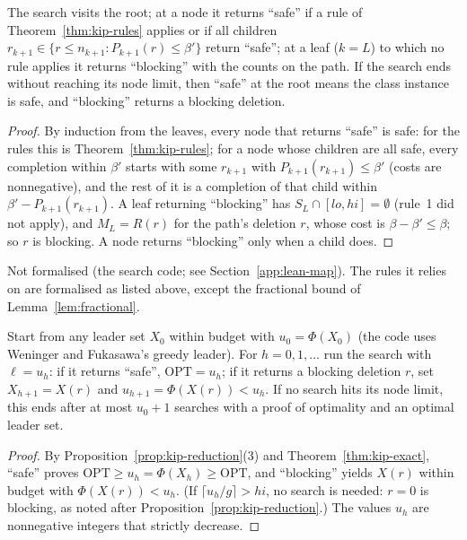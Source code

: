 \begin{theorem}[Exactness]\label{thm:kip-exact}
The search visits the root; at a node it returns ``safe'' if a rule of
Theorem~\ref{thm:kip-rules} applies or if all children
$r_{k+1}\in\{r\le n_{k+1}:P_{k+1}(r)\le\beta'\}$ return ``safe''; at a leaf
($k=L$) to which no rule applies it returns ``blocking'' with the counts on
the path. If the search ends without reaching its node limit, then ``safe''
at the root means the class instance is safe, and ``blocking'' returns a
blocking deletion.
\end{theorem}
\begin{proof}
By induction from the leaves, every node that returns ``safe'' is safe: for
the rules this is Theorem~\ref{thm:kip-rules}; for a node whose children are
all safe, every completion within $\beta'$ starts with some $r_{k+1}$ with
$P_{k+1}(r_{k+1})\le\beta'$ (costs are nonnegative), and the rest of it is a
completion of that child within $\beta'-P_{k+1}(r_{k+1})$. A leaf returning
``blocking'' has $S_L\cap[lo,hi]=\emptyset$ (rule~1 did not apply), and $M_L=R(r)$
for the path's deletion $r$, whose cost is $\beta-\beta'\le\beta$; so $r$ is
blocking. A node returns ``blocking'' only when a child does.
\end{proof}
\noindent Not formalised (the search code; see Section~\ref{app:lean-map}).
The rules it relies on are formalised as listed above, except the fractional
bound of Lemma~\ref{lem:fractional}.

\begin{corollary}\label{cor:kip-loop}
Start from any leader set $X_0$ within budget with $u_0=\Phi(X_0)$ (the code
uses Weninger and Fukasawa's greedy leader). For $h=0,1,\dots$ run the search
with $\ell=u_h$: if it returns ``safe'', $\mathrm{OPT}=u_h$; if it returns a
blocking deletion $r$, set $X_{h+1}=X(r)$ and $u_{h+1}=\Phi(X(r))<u_h$. If no
search hits its node limit, this ends after at most $u_0+1$ searches with a
proof of optimality and an optimal leader set.
\end{corollary}
\begin{proof}
By Proposition~\ref{prop:kip-reduction}(3) and Theorem~\ref{thm:kip-exact},
``safe'' proves $\mathrm{OPT}\ge u_h=\Phi(X_h)\ge\mathrm{OPT}$, and ``blocking''
yields $X(r)$ within budget with $\Phi(X(r))<u_h$. (If
$\lceil u_h/g\rceil>hi$, no search is needed: $r=0$ is blocking, as noted
after Proposition~\ref{prop:kip-reduction}.) The values $u_h$ are
nonnegative integers that strictly decrease.
\end{proof}

